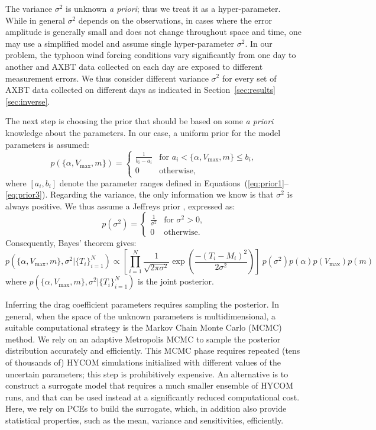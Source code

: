 The variance $\sigma^2$ is unknown \emph{a priori}; thus we treat it as a hyper-parameter.
While in general $\sigma^2$ depends on the observations, in cases where the error
amplitude is generally small and does not change throughout space and time, one may use
a simplified model and assume single hyper-parameter $\sigma^2$. In our problem, 
the typhoon wind forcing conditions vary significantly from one day to another
and AXBT data collected on each day are exposed to different measurement errors.
We thus consider different variance $\sigma^2$ for every set of AXBT data collected
on different days as indicated in Section~\ref{sec:results}\ref{sec:inverse}.

The next step is choosing the prior that should be based 
on some \emph{a priori} knowledge about the parameters. In our case, a uniform
prior for the model parameters is assumed:
\begin{equation} 
p(\{ \alpha, V_{\max}, m\}) = \begin{cases}
		\displaystyle \frac{1}{b_i-a_i} &\text{for~} a_i < \{ \alpha, V_{\max}, m\} \leq b_i ,  \\
		0 &\text{otherwise}  , 
\end{cases}
\end{equation}
where $ [a_i,b_i]$ denote the parameter ranges defined in 
Equations~(\ref{eq:prior1}--\ref{eq:prior3}).
Regarding the variance, the only information we know 
is that $\sigma^2$ is always positive.
We thus assume a Jeffreys prior \citep{sivia}, expressed as:
\begin{equation} 
p(\sigma^2) =  \begin{cases}
		\displaystyle \frac{1}{\sigma^2} &\text{for~} \sigma^2 > 0,  \\
		0 &\text{otherwise}. 
		\end{cases}
\label{eq:var_pr}
\end{equation}
Consequently, Bayes' theorem gives:
\begin{equation} 
p(\{ \alpha, V_{\max}, m\},\sigma^2 | \{T_i\}_{i=1}^N) 
\propto
\left[ \prod_{i=1}^N  \frac{1}{\sqrt{2 \pi \sigma^2}} 
\exp \left( \frac{-(T_i - M_i)^2}{2 \sigma^2} \right) \right] 
\ p(\sigma^2)p(\alpha) p(V_{\max})p(m)
\end{equation}
where $p(\{ \alpha, V_{\max}, m\},\sigma^2 | \{T_i\}_{i=1}^N)$  is the joint posterior.

Inferring the drag coefficient parameters requires 
sampling the posterior. In general, when the space of the unknown 
parameters is multidimensional, a suitable computational strategy is 
the Markov Chain Monte  Carlo (MCMC) method. 
We rely on an adaptive Metropolis MCMC \citep{Gareth2009,Haario2001} to
sample the posterior distribution accurately and efficiently.
This MCMC phase requires repeated (tens of
thousands of)
HYCOM simulations initialized with different values of the
uncertain parameters; this step is prohibitively expensive. An
alternative is to construct a surrogate model that requires a much
smaller ensemble of HYCOM runs, and that can be used instead
at a significantly reduced computational cost.  Here, we rely on
PCEs to build the surrogate, which, in addition
also provide statistical properties,  such as the mean, variance and sensitivities,
efficiently.

